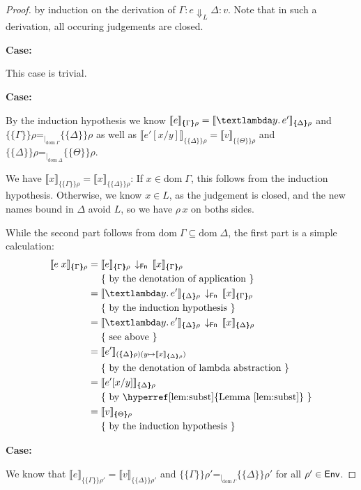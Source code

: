 \documentclass{jfp1}
\newcommand{\myref}[2]{\hyperref[#2]{#1~\ref*{#2}}}
\theoremstyle{nonumberbreak}
\newtheorem{proof}{Proof}
\newcommand{\sEnv}   {\text{\textsf{Env}}}
\newcommand{\sFnProj}[2]{#1\,\downarrow_{\text{\textsf{Fn}}}\,#2}
\newcommand{\sApp}[2]{#1\;#2}
\newcommand{\sLam}[2]{\text{\textlambda} #1.\, #2}
\newcommand{\sred}[5]{#1 : #2 \Downarrow_{#3} #4 : #5}
\newcommand{\sRule}[1]{\text{{\textsc{#1}}}}
\newcommand{\dom}[1]{\text{dom}\;#1}
\newcommand{\dsem}[2]{\llbracket #1 \rrbracket_{#2}}
\newcommand{\esem}[1]{\{\!\!\!\{#1\}\!\!\!\}}
\newcommand{\eqon}[1]{\mathrel{\mathord=_{\mathord|_{#1}}}}
\newcommand{\case}[1]{\par\smallskip\noindent\textbf{Case:} #1\nopagebreak\par\noindent\ignorespaces}
\newcommand{\aexpl}[1]{&\mathrel{\phantom{=}}\left\{\text{ #1 }\right\}}
\begin{document}
\begin{proof}
by induction on the derivation of $\sred \Gamma e L \Delta v$. Note that in such a derivation, all occuring judgements are closed.

\case{\sRule{Lam}}
This case is trivial.

\case{\sRule{App}}
By the induction hypothesis we know
$\dsem{e}{\esem{\Gamma}\rho} = \dsem{\sLam y {e'}}{\esem{\Delta}\rho}$ and $\esem{\Gamma}\rho  \eqon{\dom\Gamma} \esem{\Delta}\rho$ as well as $\dsem{e'[x/y]}{\esem{\Delta}\rho} = \dsem{v}{\esem{\Theta}\rho}$ and $\esem{\Delta}\rho \eqon{\dom\Delta} \esem{\Theta}\rho$.

We have $\dsem{x}{\esem{\Gamma}{\rho}} = \dsem{x}{\esem{\Delta}{\rho}}$: If $x\in \dom \Gamma$, this follows from the induction hypothesis. Otherwise, we know $x\in L$, as the judgement is closed, and the new names bound in $\Delta$ avoid $L$, so we have $\rho\, x$ on boths sides.

While the second part follows from $\dom\Gamma \subseteq \dom\Delta$, the first part is a simple calculation:
\begin{align*}
\dsem{\sApp{e}{x}}{\esem{\Gamma}\rho} &= \sFnProj{\dsem{e}{\esem{\Gamma}\rho}}{\dsem{x}{\esem{\Gamma}{\rho}}}\\
\aexpl{by the denotation of application} \\
&= \sFnProj{\dsem{\sLam y {e'}}{\esem{\Delta}\rho}}{\dsem{x}{\esem{\Gamma}{\rho}}}\\
\aexpl{by the induction hypothesis} \\
&= \sFnProj{\dsem{\sLam y {e'}}{\esem{\Delta}\rho}}{\dsem{x}{\esem{\Delta}{\rho}}}\\
\aexpl{see above} \\
&= \dsem{e'}{(\esem{\Delta}\rho)(y \mapsto \dsem{x}{\esem{\Delta}{\rho}})}\\
\aexpl{by the denotation of lambda abstraction} \\
&= \dsem{e'[x/y]}{\esem{\Delta}\rho}\\
\aexpl{by \myref{Lemma}{lem:subst}} \\
&= \dsem{v}{\esem{\Theta}\rho}\\
\aexpl{by the induction hypothesis}
\end{align*}

\case{\sRule{Var}}
We know that $\dsem{e}{\esem{\Gamma}\rho'}=\dsem{v}{\esem{\Delta}\rho'}$ and $\esem{\Gamma}{\rho'} \eqon{\dom\Gamma} \esem{\Delta}{\rho'}$ for all $\rho'\in\sEnv$.


\end{proof}
\end{document}
